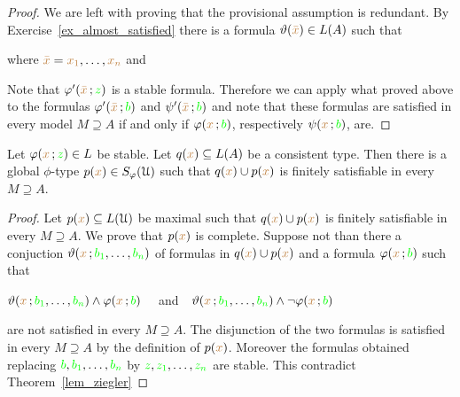 \begin{proof}
  We are left with proving that the provisional assumption is redundant.
  By Exercise~\ref{ex_almost_satisfied} there is a formula $\vartheta({\color{brown}\bar x})\in L(A)$ such that


  where ${\color{brown}\bar x}={\color{brown} x_1},\dots,{\color{brown} x_n}$ and 



  Note that $\varphi'({\color{brown}\bar x}\,;{\color{green} z})$ is a stable formula.
  Therefore we can apply what proved above to the formulas $\varphi'({\color{brown}\bar x}\,;{\color{green} b})$ and $\psi'({\color{brown}\bar x}\,;{\color{green} b})$ and note that these formulas are satisfied in every model $M\supseteq A$ if and only if $\varphi({\color{brown} x}\,;{\color{green} b})$, respectively $\psi({\color{brown} x}\,;{\color{green} b})$, are.
\end{proof}

\begin{corollary}\label{corol_stable_coheir_over_models}
  Let $\varphi({\color{brown} x}\,;{\color{green} z})\in L$ be stable.
  Let $q({\color{brown} x})\subseteq L(A)$ be a consistent type.
  Then there is a global $\phi$-type $p({\color{brown} x})\in S_{\varphi}(\EuScript U)$ such that $q({\color{brown} x})\cup p({\color{brown} x})$ is finitely satisfiable in every $M\supseteq A$.
\end{corollary}

\begin{proof}
  Let $p({\color{brown} x})\subseteq L(\EuScript U)$ be maximal such that $q({\color{brown} x})\cup p({\color{brown} x})$ is finitely satisfiable in every $M\supseteq A$.
  We prove that $p({\color{brown} x})$ is complete.
  Suppose not than there a conjuction $\vartheta({\color{brown} x}\,;{\color{green} b_1},\dots,{\color{green} b_n})$ of formulas in $q({\color{brown} x})\cup p({\color{brown} x})$ and a formula $\varphi({\color{brown} x}\,;{\color{green} b})$ such that 

  \hfil$\vartheta({\color{brown} x}\,;{\color{green} b_1},\dots,{\color{green} b_n})\wedge\varphi({\color{brown} x}\,;{\color{green} b})$ \ \ and\ \   $\vartheta({\color{brown} x}\,;{\color{green} b_1},\dots,{\color{green} b_n})\wedge\neg\varphi({\color{brown} x}\,;{\color{green} b})$ 
 
  are not satisfied in every $M\supseteq A$.
  The disjunction of the two formulas is satisfied in every $M\supseteq A$ by the definition of $p({\color{brown} x})$.
  Moreover the formulas obtained replacing ${\color{green} b},{\color{green} b_1},\dots,{\color{green} b_n}$ by ${\color{green} z},{\color{green} z_1},\dots,{\color{green} z_n}$ are stable.
  This contradict Theorem~\ref{lem_ziegler}
\end{proof}

